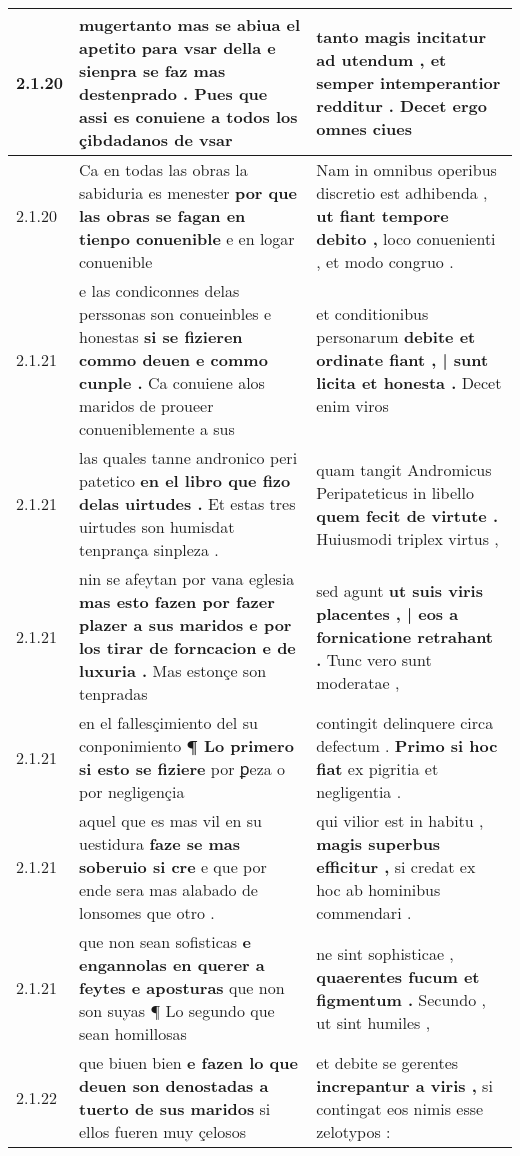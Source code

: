 \begin{tabular}{|p{1cm}|p{6.5cm}|p{6.5cm}|}
2.1.20 & mugertanto mas se abiua el apetito para vsar della \textbf{ e sienpra se faz mas destenprado . } Pues que assi es conuiene a todos los çibdadanos de vsar & tanto magis incitatur ad utendum , \textbf{ et semper intemperantior redditur . } Decet ergo omnes ciues \\\hline
2.1.20 & Ca en todas las obras la sabiduria es menester \textbf{ por que las obras se fagan en tienpo conuenible } e en logar conuenible & Nam in omnibus operibus discretio est adhibenda , \textbf{ ut fiant tempore debito , } loco conuenienti , et modo congruo . \\\hline
2.1.21 & e las condiconnes delas perssonas son conueinbles e honestas \textbf{ si se fizieren commo deuen e commo cunple . } Ca conuiene alos maridos de proueer conueniblemente a sus & et conditionibus personarum \textbf{ debite et ordinate fiant , | sunt licita et honesta . } Decet enim viros \\\hline
2.1.21 & las quales tanne andronico peri patetico \textbf{ en el libro que fizo delas uirtudes . } Et estas tres uirtudes son humisdat tenprança sinpleza . & quam tangit Andromicus Peripateticus in libello \textbf{ quem fecit de virtute . } Huiusmodi triplex virtus , \\\hline
2.1.21 & nin se afeytan por vana eglesia \textbf{ mas esto fazen por fazer plazer a sus maridos e por los tirar de forncacion e de luxuria . } Mas estonçe son tenpradas & sed agunt \textbf{ ut suis viris placentes , | eos a fornicatione retrahant . } Tunc vero sunt moderatae , \\\hline
2.1.21 & en el fallesçimiento del su conponimiento \textbf{ ¶ Lo primero si esto se fiziere } por ꝑeza o por negligençia & contingit delinquere circa defectum . \textbf{ Primo si hoc fiat } ex pigritia et negligentia . \\\hline
2.1.21 & aquel que es mas vil en su uestidura \textbf{ faze se mas soberuio si cre } e que por ende sera mas alabado de lonsomes que otro . & qui vilior est in habitu , \textbf{ magis superbus efficitur , } si credat ex hoc ab hominibus commendari . \\\hline
2.1.21 & que non sean sofisticas \textbf{ e engannolas en querer a feytes e aposturas } que non son suyas ¶ Lo segundo que sean homillosas & ne sint sophisticae , \textbf{ quaerentes fucum et figmentum . } Secundo , ut sint humiles , \\\hline
2.1.22 & que biuen bien \textbf{ e fazen lo que deuen son denostadas a tuerto de sus maridos } si ellos fueren muy çelosos & et debite se gerentes \textbf{ increpantur a viris , } si contingat eos nimis esse zelotypos : \\\hline

\end{tabular}
